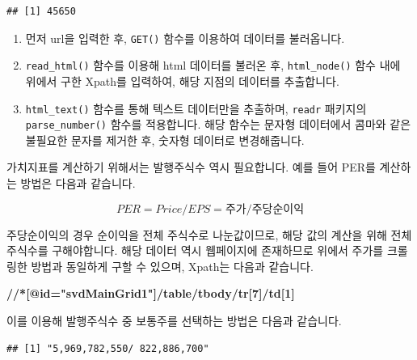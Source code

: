 \documentclass[12pt,]{book}
\newenvironment{Shaded}{\begin{snugshade}}{\end{snugshade}}
\newcommand{\DataTypeTok}[1]{\textcolor[rgb]{0.13,0.29,0.53}{#1}}
\newcommand{\ErrorTok}[1]{\textcolor[rgb]{0.64,0.00,0.00}{\textbf{#1}}}
\newcommand{\KeywordTok}[1]{\textcolor[rgb]{0.13,0.29,0.53}{\textbf{#1}}}
\newcommand{\NormalTok}[1]{#1}
\newcommand{\OperatorTok}[1]{\textcolor[rgb]{0.81,0.36,0.00}{\textbf{#1}}}
\newcommand{\StringTok}[1]{\textcolor[rgb]{0.31,0.60,0.02}{#1}}
\providecommand{\tightlist}{%
  \setlength{\itemsep}{0pt}\setlength{\parskip}{0pt}}
\begin{document}
\begin{verbatim}
## [1] 45650
\end{verbatim}

\begin{enumerate}
\def\labelenumi{\arabic{enumi}.}
\tightlist
\item
  먼저 url을 입력한 후, \texttt{GET()} 함수를 이용하여 데이터를 불러옵니다.
\item
  \texttt{read\_html()} 함수를 이용해 html 데이터를 불러온 후, \texttt{html\_node()} 함수 내에 위에서 구한 Xpath를 입력하여, 해당 지점의 데이터를 추출합니다.
\item
  \texttt{html\_text()} 함수를 통해 텍스트 데이터만을 추출하며, \texttt{readr} 패키지의 \texttt{parse\_number()} 함수를 적용합니다. 해당 함수는 문자형 데이터에서 콤마와 같은 불필요한 문자를 제거한 후, 숫자형 데이터로 변경해줍니다.
\end{enumerate}

가치지표를 계산하기 위해서는 발행주식수 역시 필요합니다. 예를 들어 PER를 계산하는 방법은 다음과 같습니다.

\[ PER = Price / EPS  = 주가 / 주당순이익\]

주당순이익의 경우 순이익을 전체 주식수로 나눈값이므로, 해당 값의 계산을 위해 전체 주식수를 구해야합니다. 해당 데이터 역시 웹페이지에 존재하므로 위에서 주가를 크롤링한 방법과 동일하게 구할 수 있으며, Xpath는 다음과 같습니다.

\begin{Shaded}
\begin{Highlighting}[]
\ErrorTok{//*[@id="svdMainGrid1"]/table/tbody/tr[7]/td[1]}
\end{Highlighting}
\end{Shaded}

이를 이용해 발행주식수 중 보통주를 선택하는 방법은 다음과 같습니다.

\begin{Shaded}
\end{Shaded}

\begin{verbatim}
## [1] "5,969,782,550/ 822,886,700"
\end{verbatim}
\end{document}

